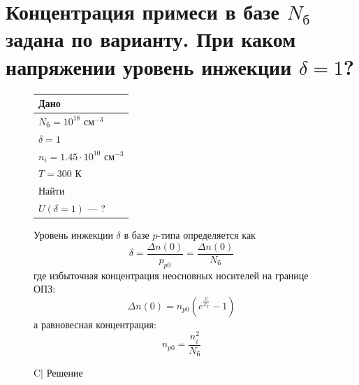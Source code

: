 \documentclass[12pt,a4paper]{article}
\theoremstyle{plain}
\theoremstyle{definition}
\theoremstyle{remark}
\numberwithin{equation}{section}
\begin{document}
\pagebreak

\section{\large\textnormal{Концентрация примеси в базе $N_\text{б}$ задана по варианту. При каком напряжении уровень инжекции $\delta = 1$?}}

\begin{figure}[H]
    \centering
    \begin{minipage}[t]{0.3\textwidth}
    \vspace{0em}
    \begin{tabularx}{\textwidth}{|X|}
        \hline
        \multicolumn{1}{|C|}{Дано} \\
        \hline
        $N_\text{б} = 10^{18}$ см$^{-3}$ \\
        $\delta = 1$ \\
        $n_i = 1.45 \cdot 10^{10}$ см$^{-3}$ \\
        $T = 300$ К \\
        \hline
        \multicolumn{1}{|C|}{Найти} \\
        \hline
        $U(\delta = 1)$ — ? \\
        \hline
    \end{tabularx}

    \vspace{0.8em}
    Уровень инжекции $\delta$ в базе $p$-типа определяется как
    \begin{equation*}
        \delta = \frac{\Delta n(0)}{p_{p0}} = \frac{\Delta n(0)}{N_\text{б}}
    \end{equation*}
    где избыточная концентрация неосновных носителей на границе ОПЗ:
    \begin{equation*}
        \Delta n(0) = n_{p0}\left(e^{\frac{U}{\varphi_T}} - 1\right)
    \end{equation*}
    а равновесная концентрация:
    \begin{equation*}
        n_{p0} = \frac{n_i^2}{N_\text{б}}
    \end{equation*}
    \end{minipage}\hfill\begin{minipage}[t]{0.7\textwidth}
        \vspace{0em}
        \begin{tabularx}{\textwidth}{C|}
            \hline
            Решение \\
            \hline
        \end{tabularx}


\end{minipage}
\end{figure}
\end{document}
